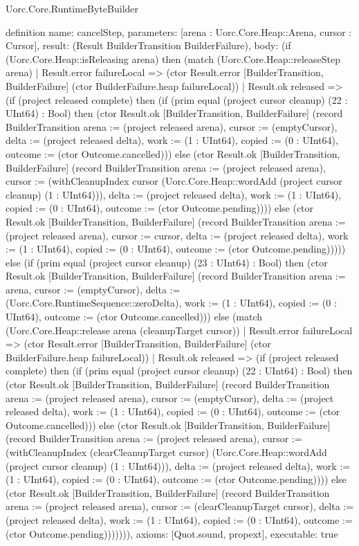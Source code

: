 \begin{lexlean}{Uorc.Core.RuntimeByteBuilder}
\begin{semanticmodule}
definition{
  name: cancelStep,
  parameters: [arena : Uorc.Core.Heap::Arena, cursor : Cursor],
  result: (Result BuilderTransition BuilderFailure),
  body: (if (Uorc.Core.Heap::isReleasing arena) then (match (Uorc.Core.Heap::releaseStep arena)
    | Result.error failureLocal => (ctor Result.error [BuilderTransition, BuilderFailure] (ctor BuilderFailure.heap failureLocal))
    | Result.ok released => (if (project released complete) then (if (prim equal (project cursor cleanup) (22 : UInt64) : Bool) then (ctor Result.ok [BuilderTransition, BuilderFailure] (record BuilderTransition {arena := (project released arena), cursor := (emptyCursor), delta := (project released delta), work := (1 : UInt64), copied := (0 : UInt64), outcome := (ctor Outcome.cancelled)})) else (ctor Result.ok [BuilderTransition, BuilderFailure] (record BuilderTransition {arena := (project released arena), cursor := (withCleanupIndex cursor (Uorc.Core.Heap::wordAdd (project cursor cleanup) (1 : UInt64))), delta := (project released delta), work := (1 : UInt64), copied := (0 : UInt64), outcome := (ctor Outcome.pending)}))) else (ctor Result.ok [BuilderTransition, BuilderFailure] (record BuilderTransition {arena := (project released arena), cursor := cursor, delta := (project released delta), work := (1 : UInt64), copied := (0 : UInt64), outcome := (ctor Outcome.pending)})))) else (if (prim equal (project cursor cleanup) (23 : UInt64) : Bool) then (ctor Result.ok [BuilderTransition, BuilderFailure] (record BuilderTransition {arena := arena, cursor := (emptyCursor), delta := (Uorc.Core.RuntimeSequence::zeroDelta), work := (1 : UInt64), copied := (0 : UInt64), outcome := (ctor Outcome.cancelled)})) else (match (Uorc.Core.Heap::release arena (cleanupTarget cursor))
    | Result.error failureLocal => (ctor Result.error [BuilderTransition, BuilderFailure] (ctor BuilderFailure.heap failureLocal))
    | Result.ok released => (if (project released complete) then (if (prim equal (project cursor cleanup) (22 : UInt64) : Bool) then (ctor Result.ok [BuilderTransition, BuilderFailure] (record BuilderTransition {arena := (project released arena), cursor := (emptyCursor), delta := (project released delta), work := (1 : UInt64), copied := (0 : UInt64), outcome := (ctor Outcome.cancelled)})) else (ctor Result.ok [BuilderTransition, BuilderFailure] (record BuilderTransition {arena := (project released arena), cursor := (withCleanupIndex (clearCleanupTarget cursor) (Uorc.Core.Heap::wordAdd (project cursor cleanup) (1 : UInt64))), delta := (project released delta), work := (1 : UInt64), copied := (0 : UInt64), outcome := (ctor Outcome.pending)}))) else (ctor Result.ok [BuilderTransition, BuilderFailure] (record BuilderTransition {arena := (project released arena), cursor := (clearCleanupTarget cursor), delta := (project released delta), work := (1 : UInt64), copied := (0 : UInt64), outcome := (ctor Outcome.pending)})))))),
  axioms: [Quot.sound, propext],
  executable: true
}


\end{semanticmodule}
\end{lexlean}
